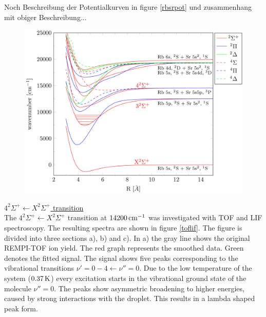 \documentclass[parskip,12pt,headsepline,a4paper] {scrbook}
\begin{document}
Noch Beschreibung der Potentialkurven in figure \ref{rbsrpot} und zusammenhang mit obiger Beschreibung...
\begin{figure}[ht]
\centerline{
\includegraphics[width=16cm]{./resultsRbSr/Potentials.jpg}}
\end{figure}

\underline{$4 ^2\Sigma^+ \leftarrow X ^2\Sigma^+$ transition} \\
The $4 ^2\Sigma^+ \leftarrow X ^2\Sigma^+$ transition at $\unit[14200]{cm^{-1}}$ was investigated with TOF and LIF spectroscopy. The resulting spectra are shown in figure \ref{toflif}. The figure is divided into three sections a), b) and c). In a) the gray line shows the original REMPI-TOF ion yield. The red graph represents the smoothed data. Green denotes the fitted signal. %
The signal shows five peaks corresponding to the vibrational transitions $\nu'=0-4 \leftarrow \nu''=0$. Due to the low temperature of the system ($\unit[0.37]{K}$) every excitation starts in the vibrational ground state of the molecule $\nu''=0$. The peaks show asymmetric broadening to higher energies, caused by strong interactions with the droplet. This results in a lambda shaped peak form.
\end{document}
